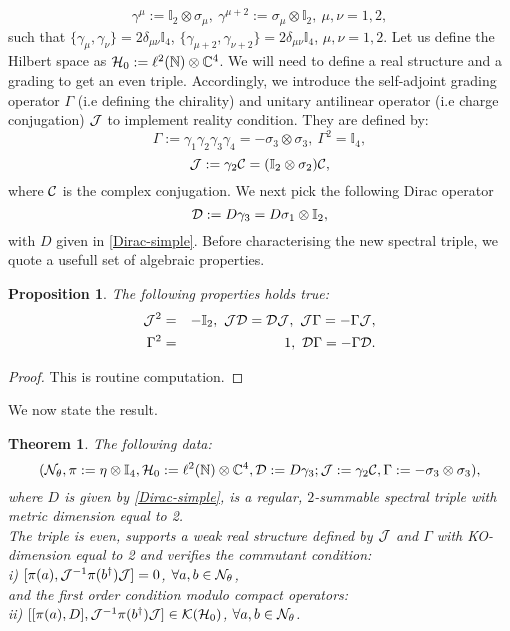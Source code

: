 \documentclass[a4paper]{jpconf}
\numberwithin{equation}{section}
\newcommand\bbone{{ \mathbb{I}}}
\newtheorem{theorem}[Theorem]{Theorem}
\newtheorem{proposition}[Theorem]{Proposition}
\theoremstyle{nonumberplain}
\newtheorem{proof}{Proof}
\begin{document}
\begin{equation}
\gamma^\mu:=\bbone_2\otimes\sigma_\mu,\ \gamma^{\mu+2}:=\sigma_\mu\otimes\bbone_2,\ \mu,\nu=1,2,\label{ko-clifford}
\end{equation}
such that $\{\gamma_\mu,\gamma_\nu \}=2\delta_{\mu\nu}\bbone_4$, $\{\gamma_{\mu+2},\gamma_{\nu+2} \}=2\delta_{\mu\nu}\bbone_4$, $\mu,\nu=1,2$. Let us define the Hilbert space as ${\cal{H}}_0:=\ell^2(\mathbb{N})\otimes\mathbb{C}^4$. We will need to define a real structure and a grading to get an even triple. Accordingly, we introduce the self-adjoint grading operator $\Gamma$ (i.e defining the chirality) and unitary antilinear operator (i.e charge conjugation) ${\cal{J}}$ to implement reality condition. They are defined by:
\begin{equation}
\Gamma:=\gamma_1\gamma_2\gamma_3\gamma_4=-\sigma_3\otimes\sigma_3,\ \Gamma^2=\bbone_4\label{chiral},
\end{equation}
\begin{equation}
{\cal{J}}:=\gamma_2{\cal{C}}=(\bbone_2\otimes\sigma_2){\cal{C}},
\end{equation}
where ${\cal{C}}$ is the complex conjugation. We next pick the following Dirac operator
\begin{equation}
{\cal{D}}:=D\gamma_3=D\sigma_1\otimes\bbone_2,
\end{equation}
with $D$ given in \eqref{Dirac-simple}. Before characterising the new spectral triple, we quote a usefull set of algebraic properties.
\begin{proposition}\label{KO-real}
The following properties holds true:
\begin{eqnarray}
{\cal{J}}^2&=&-\bbone_2,\ {\cal{J}}{\cal{D}}={\cal{D}}{\cal{J}},\ {\cal{J}}\Gamma=-\Gamma{\cal{J}},\label{KO-dim}\\ 
\Gamma^2&=&1,\ {\cal{D}}\Gamma=-\Gamma{\cal{D}}\label{real-struct-grad}.
\end{eqnarray}
\end{proposition}
\begin{proof}
This is routine computation.
\end{proof}
We now state the result.
\begin{theorem}\label{th2}
The following data:
 \begin{equation}
({\cal{N}}_\theta,\pi:=\eta\otimes\bbone_4,{\cal{H}}_0:=\ell^2(\mathbb{N})\otimes\mathbb{C}^4,{\cal{D}}:=D\gamma_3;{\cal{J}}:=\gamma_2{\cal{C}},\Gamma:=-\sigma_3\otimes\sigma_3),\label{ncg-fluctuat}
\end{equation}
where $D$ is given by \eqref{Dirac-simple}, is a regular, $2$-summable spectral triple with metric dimension equal to 2. \\
The triple is even, supports a weak real structure defined by ${\cal{J}}$ and $\Gamma$ with KO-dimension equal to 2 and verifies the commutant condition:\\
i) $[\pi(a),{\cal{J}}^{-1}\pi(b^\dag){\cal{J}}]=0$, $\forall a,b\in{\cal{N}}_\theta$,\\
and the first order condition modulo compact operators: \\
ii) $[[\pi(a),D],{\cal{J}}^{-1}\pi(b^\dag){\cal{J}}]\in{\cal{K}}({\cal{H}}_0)$, $\forall a,b\in{\cal{N}}_\theta$.
\end{theorem}
\end{document}
